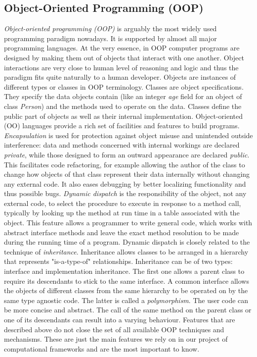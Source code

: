 \subsection{Object-Oriented Programming (OOP)}
\label{background_oop}
\quad \textit{Object-oriented programming (OOP)} is arguably the most widely used programming paradigm nowadays. It is supported by almost all major programming languages. At the very essence, in OOP computer programs are designed by making them out of objects that interact with one another. Object interactions are very close to human level of reasoning and logic and thus the paradigm fits quite naturally to a human developer.\newline\null
\quad Objects are instances of different types or classes in OOP terminology. Classes are object specifications. They specify the data objects contain (like an integer \textit{age} field for an object of class \textit{Person}) and the methods used to operate on the data. Classes define the public part of objects as well as their internal implementation. Object-oriented (OO) languages provide a rich set of facilities and features to build programs.\newline\null
\quad \textit{Encapsulation} is used for protection against object misuse and unintended outside interference: data and methods concerned with internal workings are declared \textit{private}, while those designed to form an outward appearance are declared \textit{public}. This facilitates code refactoring, for example allowing the author of the class to change how objects of that class represent their data internally without changing any external code. It also eases debugging by better localizing functionality and thus possible bugs.\newline\null
\quad \textit{Dynamic dispatch} is the responsibility of the object, not any external code, to select the procedure to execute in response to a method call, typically by looking up the method at run time in a table associated with the object. This feature allows a programmer to write general code, which works with abstract interface methods and leave the exact method resolution to be made during the running time of a program.\newline\null
\quad Dynamic dispatch is closely related to the technique of \textit{inheritance}. Inheritance allows classes to be arranged in a hierarchy that represents "is-a-type-of" relationships. Inheritance can be of two types: interface and implementation inheritance. The first one allows a parent class to require its descendants to stick to the same interface. A common interface allows the objects of different classes from the same hierarchy to be operated on by the same type agnostic code. The latter is called a \textit{polymorphism}. The user code can be more concise and abstract. The call of the same method on the parent class or one of its descendants can result into a varying behaviour.\newline\null
\quad Features that are described above do not close the set of all available OOP techniques and mechanisms. These are just the main features we rely on in our project of computational frameworks and are the most important to know.
